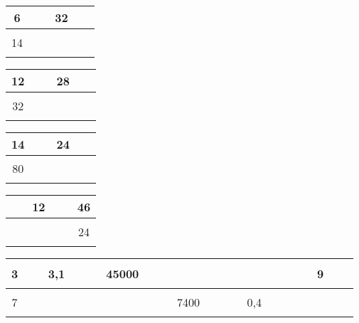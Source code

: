 \begin{multicols}{4}\noindent
  \begin{center} \begin{tabular}{|c|c|}  \hline
      6    & 32\\  \hline
      14 & $\phantom{\dfrac{azertyuiop}{O}}$\\  \hline
    \end{tabular} \end{center}
  \Pointilles[2]
  \begin{center} \begin{tabular}{|c|c|}   \hline
      12  & 28\\  \hline
      32 & $\phantom{\dfrac{azertyuiop}{O}}$\\  \hline
    \end{tabular} \end{center}
  \Pointilles[2]
  \begin{center} \begin{tabular}{|c|c|}   \hline
      14  & 24\\  \hline
      80 & $\phantom{\dfrac{azertyuiop}{O}}$\\  \hline
    \end{tabular} \end{center}
  \Pointilles[2]
  \begin{center}\begin{tabular}{|c|c|}  \hline
      12 & 46\\  \hline
      $\phantom{\dfrac{azertyuiop}{O}}$ & 24\\  \hline
    \end{tabular} \end{center}

  \Pointilles[2]

\end{multicols}

\begin{center} \begin{tabular}{|c|c|c|c|c|c|} \hline
   3 &  3,1                   &                  45000 &  $\phantom{\dfrac{azertyuiop}{O}}$ & $\phantom{\dfrac{azertyuiop}{O}}$&                     9\\ \hline
   7 &  $\phantom{\dfrac{azertyuiop}{O}}$ & $\phantom{\dfrac{azertyuiop}{O}}$ &                   7400 &                    0,4 &  $\phantom{\dfrac{azertyuiop}{O}}$\\ \hline     
  \end{tabular}\end{center}

